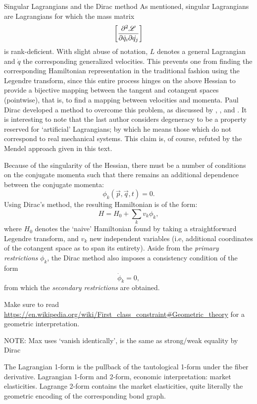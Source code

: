 \begin{aside}{Singular Lagrangians and the Dirac method}
    As mentioned, singular Lagrangians are Lagrangians for which the mass matrix
    $$ \qty[\pdv{\mathscr{L}}{\dot{q}_i}{\dot{q_j}}]$$
    is rank-deficient. With slight abuse of notation, $L$ denotes a general Lagrangian and $\dot{q}$ the corresponding generalized velocities. This prevents one from finding the corresponding Hamiltonian representation in the traditional fashion using the Legendre transform, since this entire process hinges on the above Hessian to provide a bijective mapping between the tangent and cotangent spaces (pointwise), that is, to find a mapping between velocities and momenta. Paul Dirac developed a method to overcome this problem, as discussed by \citet{Dirac1950}, \citet{Kunzle1969}, and \citet{Cisneros-Parra2012}. It is interesting to note that the last author considers degeneracy to be a property reserved for `artificial' Lagrangians; by which he means those which do not correspond to real mechanical systems. This claim is, of course, refuted by the Mendel approach given in this text.

    Because of the singularity of the Hessian, there must be a number of conditions on the conjugate momenta such that there remains an additional dependence between the conjugate momenta:
    $$ \phi_k(\vec{p}, \vec{q}, t) = 0. $$
    Using Dirac's method, the resulting Hamiltonian is of the form: \cite{Cisneros-Parra2012}
    $$ H = H_0 + \sum_k v_k \phi_k, $$
    where $H_0$ denotes the `naive' Hamiltonian found by taking a straightforward Legendre transform, and $v_k$ new independent variables (i.e, additional coordinates of the cotangent space as to span its entirety). Aside from the \emph{primary restrictions} $\phi_k$, the Dirac method also imposes a consistency condition of the form 
    $$ \dot{\phi}_k = 0, $$
    from which the \emph{secondary restrictions} are obtained.

    Make sure to read \url{https://en.wikipedia.org/wiki/First_class_constraint#Geometric_theory} for a geometric interpretation.

    NOTE: Max uses `vanish identically', is the same as strong/weak equality by Dirac
\end{aside}

The Lagrangian 1-form is the pullback of the tautological 1-form under the fiber derivative. Lagrangian 1-form and 2-form, economic interpretation: market elasticities. Lagrange 2-form contains the market elasticities, quite literally the geometric encoding of the corresponding bond graph.
    
